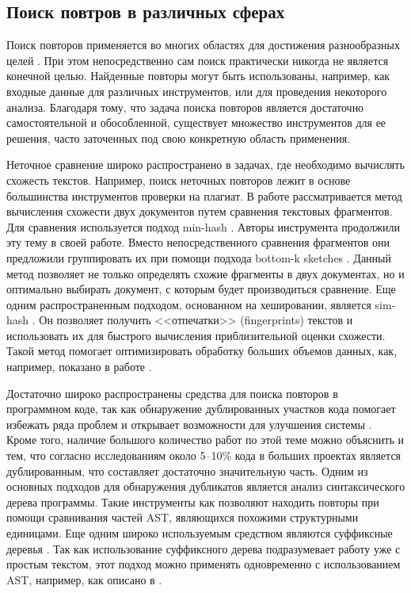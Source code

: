 \documentclass[14pt]{matmex-diploma-custom}
\begin{document}
\subsection{Поиск повтров в различных сферах}
Поиск повторов применяется во многих областях для достижения разнообразных целей \cite{bib:art:NearDupSurvey}. При этом непосредственно сам поиск практически никогда не является конечной целью. Найденные повторы могут быть использованы, например, как входные данные для различных инструментов, или для проведения некоторого анализа. Благодаря тому, что задача поиска повторов является достаточно самостоятельной и обособленной, существует множество инструментов для ее решения, часто заточенных под свою конкретную область применения.

Неточное сравнение широко распространено в задачах, где необходимо вычислять схожесть текстов. Например, поиск неточных повторов лежит в основе большинства инструментов проверки на плагиат. В работе \cite{bib:tool:Allign} рассматривается метод вычисления схожести двух документов путем сравнения текстовых фрагментов. Для сравнения используется подход min-hash \cite{bib:art:MinHash}. Авторы инструмента \cite{bib:tool:TxtAling} продолжили эту тему в своей работе. Вместо непосредственного сравнения фрагментов они предложили группировать их при помощи подхода bottom-k sketches \cite{bib:art:Bottom-sketch}. Данный метод позволяет не только определять схожие фрагменты в двух документах, но и оптимально выбирать документ, с которым будет производиться сравнение. Еще одним распространенным подходом, основанном на хешировании, является sim-hash \cite{bib:art:SimHash}. Он позволяет получить <<отпечатки>> (fingerprints) текстов и использовать их для быстрого вычисления приблизительной оценки схожести. Такой метод помогает оптимизировать обработку больших объемов данных, как, например, показано в работе \cite{bib:tool:SpamDetect}.

Достаточно широко распространены средства для поиска повторов в программном коде, так как обнаружение дублированных участков кода помогает избежать ряда проблем и открывает возможности для улучшения системы \cite{bib:art:SoftwareClonesSurvey, bib:art:SoftwareClonesReview}. Кроме того, наличие большого количество работ по этой теме можно объяснить и тем, что согласно исследованиям \cite{bib:art:LagueCloneStudy, bib:art:BakerCloneStudy} около 5--10\% кода в больших проектах является дублированным, что составляет достаточно значительную часть. Одним из основных подходов для обнаружения дубликатов является анализ синтаксического дерева программы. Такие инструменты как \cite{bib:tool:ASTRefactor, bib:tool:ASTSearch} позволяют находить повторы при помощи сравнивания частей AST, являющихся похожими структурными единицами. Еще одним широко используемым средством являются суффиксные деревья \cite{bib:art:SuffixTree}. Так как использование суффиксного дерева подразумевает работу уже с простым текстом, этот подход можно применять одновременно с использованием AST, например, как описано в \cite{bib:tool:ASTSuffix}.
\end{document}
